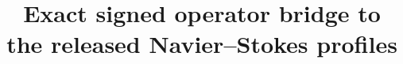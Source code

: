 \documentclass[11pt]{article}
\begin{document}
\title{Exact signed operator bridge to the released Navier--Stokes profiles}
\author{}
\date{}
\maketitle

\end{document}
